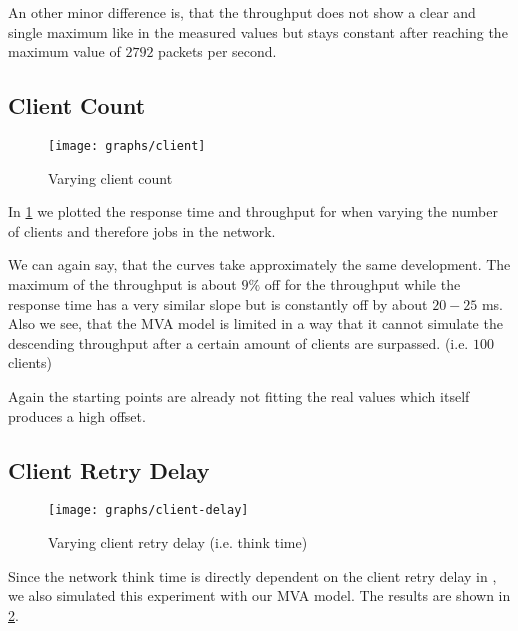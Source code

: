 \documentclass[a4paper, oneside]{csthesis}
\begin{document}
    An other minor difference is, that the throughput does not show a clear and
    single maximum like in the measured values but stays constant after reaching
    the maximum value of $2792$ packets per second.
    
    \newpage
    
\subsection{Client Count}


    \begin{figure}[th]
        \centering
            \texttt{[image: graphs/client]}
            \caption{Varying client count}
            \label{fig:clientCount}
    \end{figure}
    
    In \cref{fig:clientCount} we plotted the response time and throughput for
    \telesto{} when varying the number of clients and therefore jobs in the
    network.
    
    We can again say, that the curves take approximately the same development.
    The maximum of the throughput is about $9 \%$ off for the throughput while
    the response time has a very similar slope but is constantly off by about
    $20-25$ ms. Also we see, that the MVA model is limited in a way that it
    cannot simulate the descending throughput after a certain amount of clients
    are surpassed. (i.e. $100$ clients)
    
    Again the starting points are already not fitting the real values which
    itself produces a high offset.
    
    \newpage
    
\subsection{Client Retry Delay}
    
    
    \begin{figure}[th]
        \centering
            \texttt{[image: graphs/client-delay]}
            \caption{Varying client retry delay (i.e. think time)}
            \label{fig:retry-delay}
    \end{figure}

    Since the network think time is directly dependent on the client retry delay
    in \telesto, we also simulated this experiment with our MVA model. The
    results are shown in \cref{fig:retry-delay}.
    
\end{document}

